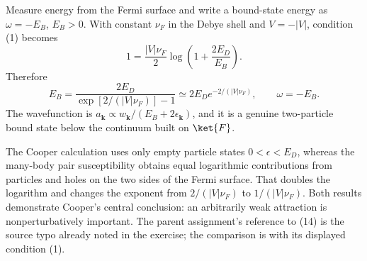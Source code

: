 \begin{enumerate}
\begin{enumerate}
    Measure energy from the Fermi surface and write a bound-state energy
    as \(\omega=-E_B\), \(E_B>0\).  With constant \(\nu_F\) in the Debye
    shell and \(V=-|V|\), condition (1) becomes
    \[
      1=\frac{|V|\nu_F}{2}
        \log\left(1+\frac{2E_D}{E_B}\right).
    \]
    Therefore
    \[
      \boxed{E_B=
        \frac{2E_D}{\exp[2/(|V|\nu_F)]-1}
        \simeq2E_D e^{-2/(|V|\nu_F)},\qquad
        \omega=-E_B.}
    \]
    The wavefunction is
    \(a_{\mathbf k}\propto
      w_{\mathbf k}/(E_B+2\epsilon_{\mathbf k})\), and it is a genuine
    two-particle bound state below the continuum built on \(\ket{F}\).

    The Cooper calculation uses only empty particle states
    \(0<\epsilon<E_D\), whereas the many-body pair susceptibility obtains
    equal logarithmic contributions from particles and holes on the two
    sides of the Fermi surface.  That doubles the logarithm and changes
    the exponent from \(2/(|V|\nu_F)\) to \(1/(|V|\nu_F)\).  Both results
    demonstrate Cooper's central conclusion: an arbitrarily weak
    attraction is nonperturbatively important.  The parent assignment's
    reference to (14) is the source typo already noted in the exercise;
    the comparison is with its displayed condition (1).
  \end{enumerate}

\end{enumerate}
